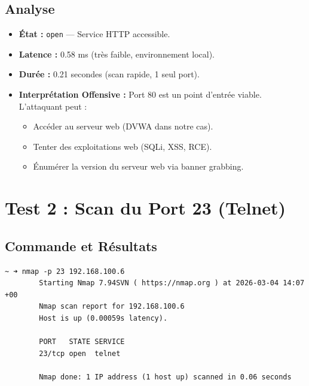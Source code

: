 \documentclass[12pt,a4paper,openany]{report}
\begin{document}
	\subsection{Analyse}
	\begin{itemize}
		\item \textbf{État :} \texttt{open} --- Service HTTP accessible.
		\item \textbf{Latence :} 0.58 ms (très faible, environnement local).
		\item \textbf{Durée :} 0.21 secondes (scan rapide, 1 seul port).
		\item \textbf{Interprétation Offensive :} Port 80 est un point d'entrée viable. L'attaquant peut :
		\begin{itemize}
			\item Accéder au serveur web (DVWA dans notre cas).
			\item Tenter des exploitations web (SQLi, XSS, RCE).
			\item Énumérer la version du serveur web via banner grabbing.
		\end{itemize}
	\end{itemize}
	
	\section{Test 2 : Scan du Port 23 (Telnet)}
	\subsection{Commande et Résultats}
	\begin{lstlisting}[caption=Scan Nmap du port Telnet]
		~ ➜ nmap -p 23 192.168.100.6
		Starting Nmap 7.94SVN ( https://nmap.org ) at 2026-03-04 14:07 +00
		Nmap scan report for 192.168.100.6
		Host is up (0.00059s latency).
		
		PORT   STATE SERVICE
		23/tcp open  telnet
		
		Nmap done: 1 IP address (1 host up) scanned in 0.06 seconds
	\end{lstlisting}
	
\end{document}
